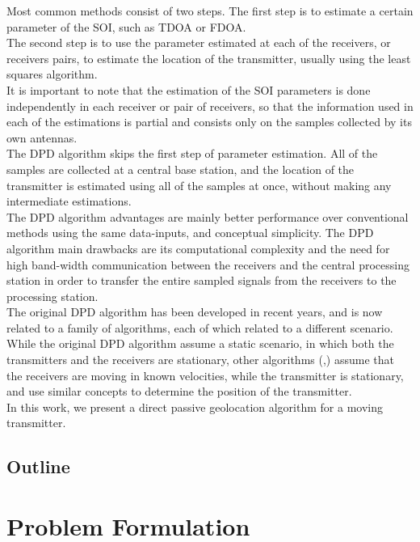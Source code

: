 \documentclass[10pt,a4paper]{report}
\begin{document}
Most common methods consist of two steps. The first step is to estimate a certain parameter of the
SOI, such as TDOA or FDOA. \\
The second step is to use the parameter estimated at each of the receivers, or receivers pairs, to estimate the location of the transmitter, usually using the least squares algorithm.\\
It is important to note that the estimation of the SOI parameters is done independently in each receiver or pair of receivers, so that the information used in each of the estimations is partial and consists only on the samples collected by its own antennas.\\
The DPD algorithm skips the first step of parameter estimation. All of the samples are collected at a central base station, and the location of the transmitter is estimated using all of the samples at once, without making any intermediate estimations.\\

The DPD algorithm advantages are mainly better performance over conventional methods using the same data-inputs, and conceptual simplicity. The DPD algorithm main drawbacks are its computational complexity and the need for high band-width communication between the receivers and the central processing station in order to transfer the entire sampled signals from the receivers to the processing station.\\

The original DPD algorithm\cite{dpd} has been developed in recent years, and is now related to a family of algorithms, each of which related to a different scenario.
While the original DPD algorithm assume a static scenario, in which both the transmitters and the receivers are stationary, other algorithms (\cite{dpd_nb},\cite{dop_dpd}) assume that the receivers are moving in known velocities, while the transmitter is stationary, and use similar concepts to determine the position of the transmitter.\\

In this work, we present a direct passive geolocation algorithm for a moving transmitter.

\section{Outline}

\chapter{Problem Formulation}
\end{document}
